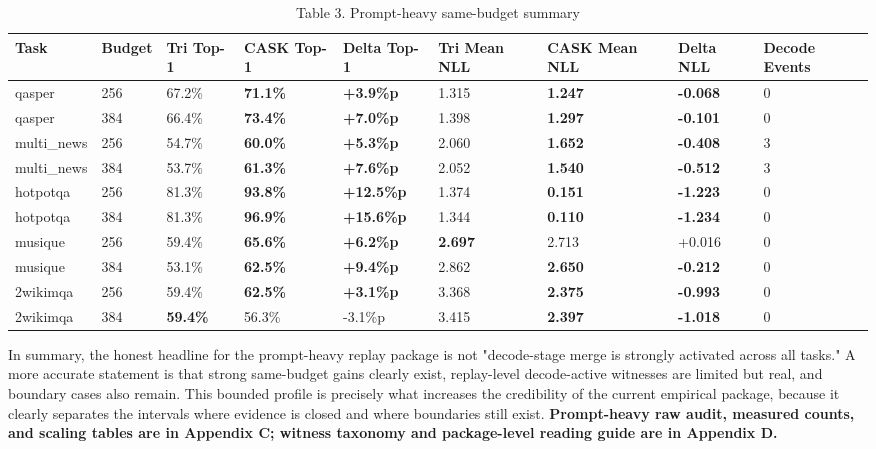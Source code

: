 \begin{table}[H]
\centering
\small
\caption{Table 3. Prompt-heavy same-budget summary}
\begin{tabularx}{\textwidth}{YYYYYYYYY}
\toprule
Task & Budget & Tri Top-1 & CASK Top-1 & Delta Top-1 & Tri Mean NLL & CASK Mean NLL & Delta NLL & Decode Events \\
\midrule
qasper & 256 & 67.2\% & \textbf{71.1\%} & \textbf{+3.9\%p} & 1.315 & \textbf{1.247} & \textbf{-0.068} & 0 \\
qasper & 384 & 66.4\% & \textbf{73.4\%} & \textbf{+7.0\%p} & 1.398 & \textbf{1.297} & \textbf{-0.101} & 0 \\
multi\_news & 256 & 54.7\% & \textbf{60.0\%} & \textbf{+5.3\%p} & 2.060 & \textbf{1.652} & \textbf{-0.408} & 3 \\
multi\_news & 384 & 53.7\% & \textbf{61.3\%} & \textbf{+7.6\%p} & 2.052 & \textbf{1.540} & \textbf{-0.512} & 3 \\
hotpotqa & 256 & 81.3\% & \textbf{93.8\%} & \textbf{+12.5\%p} & 1.374 & \textbf{0.151} & \textbf{-1.223} & 0 \\
hotpotqa & 384 & 81.3\% & \textbf{96.9\%} & \textbf{+15.6\%p} & 1.344 & \textbf{0.110} & \textbf{-1.234} & 0 \\
musique & 256 & 59.4\% & \textbf{65.6\%} & \textbf{+6.2\%p} & \textbf{2.697} & 2.713 & +0.016 & 0 \\
musique & 384 & 53.1\% & \textbf{62.5\%} & \textbf{+9.4\%p} & 2.862 & \textbf{2.650} & \textbf{-0.212} & 0 \\
2wikimqa & 256 & 59.4\% & \textbf{62.5\%} & \textbf{+3.1\%p} & 3.368 & \textbf{2.375} & \textbf{-0.993} & 0 \\
2wikimqa & 384 & \textbf{59.4\%} & 56.3\% & -3.1\%p & 3.415 & \textbf{2.397} & \textbf{-1.018} & 0 \\
\bottomrule
\end{tabularx}
\end{table}


In summary, the honest headline for the prompt-heavy replay package is not "decode-stage merge is strongly activated across all tasks." A more accurate statement is that strong same-budget gains clearly exist, replay-level decode-active witnesses are limited but real, and boundary cases also remain. This bounded profile is precisely what increases the credibility of the current empirical package, because it clearly separates the intervals where evidence is closed and where boundaries still exist. \textbf{Prompt-heavy raw audit, measured counts, and scaling tables are in Appendix C; witness taxonomy and package-level reading guide are in Appendix D.}

